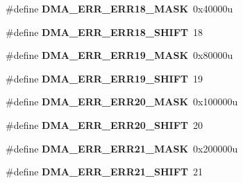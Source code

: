 \begin{DoxyCompactItemize}
\item 
\hypertarget{group___d_m_a___register___masks_ga8c30f5acbed1bfabf0aef105704c9f94}{}\#define {\bfseries D\+M\+A\+\_\+\+E\+R\+R\+\_\+\+E\+R\+R18\+\_\+\+M\+A\+S\+K}~0x40000u\label{group___d_m_a___register___masks_ga8c30f5acbed1bfabf0aef105704c9f94}

\item 
\hypertarget{group___d_m_a___register___masks_gafcb57e5df81b2b2474949b0506b739e6}{}\#define {\bfseries D\+M\+A\+\_\+\+E\+R\+R\+\_\+\+E\+R\+R18\+\_\+\+S\+H\+I\+F\+T}~18\label{group___d_m_a___register___masks_gafcb57e5df81b2b2474949b0506b739e6}

\item 
\hypertarget{group___d_m_a___register___masks_gae51e4e45cbf8c289c61e039a96b65616}{}\#define {\bfseries D\+M\+A\+\_\+\+E\+R\+R\+\_\+\+E\+R\+R19\+\_\+\+M\+A\+S\+K}~0x80000u\label{group___d_m_a___register___masks_gae51e4e45cbf8c289c61e039a96b65616}

\item 
\hypertarget{group___d_m_a___register___masks_ga2749310de8671ce201952b5f514a59c8}{}\#define {\bfseries D\+M\+A\+\_\+\+E\+R\+R\+\_\+\+E\+R\+R19\+\_\+\+S\+H\+I\+F\+T}~19\label{group___d_m_a___register___masks_ga2749310de8671ce201952b5f514a59c8}

\item 
\hypertarget{group___d_m_a___register___masks_gada51cf752298ff20b2b70ac401b5f365}{}\#define {\bfseries D\+M\+A\+\_\+\+E\+R\+R\+\_\+\+E\+R\+R20\+\_\+\+M\+A\+S\+K}~0x100000u\label{group___d_m_a___register___masks_gada51cf752298ff20b2b70ac401b5f365}

\item 
\hypertarget{group___d_m_a___register___masks_gab94be81bd05b5a6364657a9a16e71d3f}{}\#define {\bfseries D\+M\+A\+\_\+\+E\+R\+R\+\_\+\+E\+R\+R20\+\_\+\+S\+H\+I\+F\+T}~20\label{group___d_m_a___register___masks_gab94be81bd05b5a6364657a9a16e71d3f}

\item 
\hypertarget{group___d_m_a___register___masks_ga022f37d2b26cbbceef40e5ba6af6a18f}{}\#define {\bfseries D\+M\+A\+\_\+\+E\+R\+R\+\_\+\+E\+R\+R21\+\_\+\+M\+A\+S\+K}~0x200000u\label{group___d_m_a___register___masks_ga022f37d2b26cbbceef40e5ba6af6a18f}

\item 
\hypertarget{group___d_m_a___register___masks_ga56cce87bb88e37e67730d8f8eff19a2d}{}\#define {\bfseries D\+M\+A\+\_\+\+E\+R\+R\+\_\+\+E\+R\+R21\+\_\+\+S\+H\+I\+F\+T}~21\label{group___d_m_a___register___masks_ga56cce87bb88e37e67730d8f8eff19a2d}


\end{DoxyCompactItemize}
